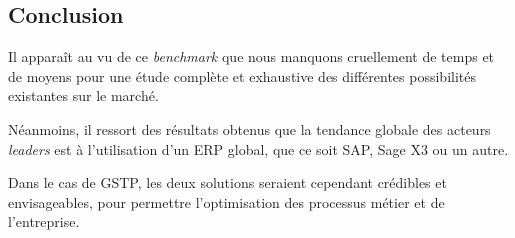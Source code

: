\subsection{Conclusion}

Il apparaît au vu de ce {\sl benchmark} que nous manquons
cruellement de temps et de moyens pour une étude complète
et exhaustive des différentes possibilités existantes sur le
marché.

Néanmoins, il ressort des résultats obtenus que la tendance
globale des acteurs {\sl leaders} est à l'utilisation d'un
ERP global, que ce soit SAP, Sage X3 ou un autre.

Dans le cas de GSTP, les deux solutions seraient cependant
crédibles et envisageables, pour permettre l'optimisation des
processus métier et de l'entreprise.

\vfill
\pagebreak
